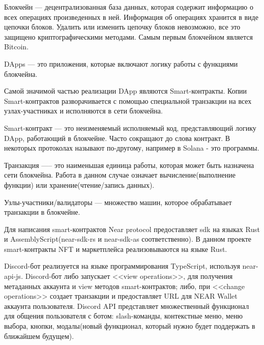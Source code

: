 \begin{definition}
    Блокчейн --- децентрализованная база данных, которая содержит информацию о всех операциях произведенных в ней.
    Информация об операциях хранится в виде цепочки блоков.  Удалить или изменить цепочку блоков невозможно, все это защищено криптографическими методами. Самым первым блокчейном является Bitcoin\cite{nakamoto2012bitcoin}.
\end{definition}

\begin{definition}
    DApps --- это приложения, которые включают логику работы с функциями блокчейна\cite{ramamurthy2020blockchain}.
\end{definition}

Самой значимой частью реализации DApp являются Smart-контракты. Копии Smart-контрактов разворачивается с помощью специальной транзакции на всех узлах-участниках и исполняются в сети блокчейна.

\begin{definition}
    Smart-контракт --- это неизменяемый исполняемый код, представляющий логику DApp, работающий в блокчейне\cite{ramamurthy2020blockchain}. Часто сокращают до слова контракт. В некоторых протоколах называют по-другому, например в Solana - это программы\cite{solanaprogramlibrarydocs}.
\end{definition}

\begin{definition}
    Транзакция —-- это наименьшая единица работы, которая может быть назначена сети блокчейна. Работа в данном случае означает вычисление(выполнение функции) или хранение(чтение/запись данных)\cite{neardocumentationtransaction}.
\end{definition}

\begin{definition}
    Узлы-участники/валидаторы --- множество машин, которое обрабатывает транзакции в блокчейне.
\end{definition}

Для написания smart-контрактов Near protocol предоставляет sdk на языках Rust и AssemblyScript(near-sdk-rs\cite{nearsdkrs} и near-sdk-as\cite{nearsdkas} соответственно). В данном проекте smart-контракты NFT и маркетплейса реализовываются на языке Rust.

Discord-бот реализуется на языке программирования TypeScript, используя near-api-js\cite{nearapijs}. Discord-бот либо запускает <<view operations>>, для получения метаданных аккаунта и view методов smart-контрактов; либо, при <<change operations>> создает транзакции и предоставляет URL для NEAR Wallet аккаунта пользователя. Discord API представляет множественный функционал для общения пользователя с ботом: slash-команды\cite{discordjsbuttons}, контекстные меню\cite{discordtscontextmenu}, меню выбора\cite{discordjsselectmenus}, кнопки\cite{discordjsbuttons}, модалы\cite{discordjsmodals}(новый функционал, который нужно будет поддержать в ближайшем будущем).


